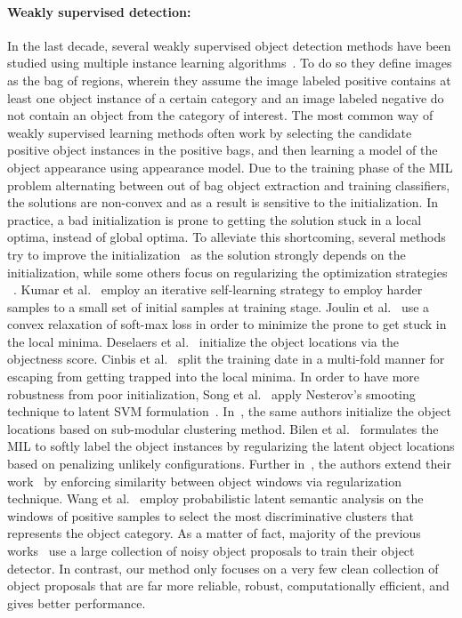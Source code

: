 \documentclass[10pt,twocolumn,letterpaper]{article}
\begin{document}
\paragraph{Weakly supervised detection:}
In the last decade, several weakly supervised object detection methods have been studied using multiple instance learning algorithms~\cite{bilen14,bilen15,siva,song14}. To do so they define images as the bag of regions, wherein they assume the image labeled positive contains at least one object instance of a certain category and  an image labeled negative do not contain an object from the category of interest. The most common way of weakly supervised learning methods often work by selecting the candidate positive object instances in the positive bags, and then learning a model of the object appearance using appearance model. Due to the training phase of the MIL problem alternating between out of bag object extraction and training classifiers, the solutions are non-convex and as a result is sensitive to the initialization. In practice, a bad initialization is prone to getting the solution stuck in a local optima, instead of global optima. To alleviate this shortcoming, several methods try to improve the initialization~\cite{song14a,does10, Siva12,siva} as the solution strongly depends on the initialization, while some others focus on regularizing the optimization strategies ~\cite{bilen14,bilen15,cinbis}. Kumar et al.~\cite{kumar} employ an iterative self-learning strategy to employ harder samples to a small set of initial samples at training stage. Joulin et al.~\cite{joulin} use a convex  relaxation of soft-max loss in order to minimize the prone to get stuck in the local minima. Deselaers et al.~\cite{does10}  initialize the  object locations via the objectness score. Cinbis et al.~\cite{cinbis} split the training date in a multi-fold manner for escaping from getting trapped into the local minima. In order to have more robustness from poor initialization, Song et al.~\cite{song14}  apply Nesterov's smooting technique to latent SVM formulation~\cite{dpm}. In~\cite{song14a}, the same authors initialize the object locations based on sub-modular clustering method. Bilen et al.~\cite{bilen14} formulates the MIL to softly label the object instances by regularizing the latent object locations based on penalizing unlikely configurations. Further in~\cite{bilen15}, the authors extend their work~\cite{bilen14} by enforcing similarity between object windows via regularization  technique.  Wang et al.~\cite{wang14}  employ probabilistic latent semantic analysis on the windows of positive samples to select the most discriminative clusters that represents the object category.  As a matter of fact, majority of the previous works~\cite{reed14,sukh14} use a large collection of noisy object proposals to train their object detector. In contrast, our method only focuses on a very few clean collection of object proposals that are far more reliable, robust, computationally efficient, and gives better performance.
\end{document}

